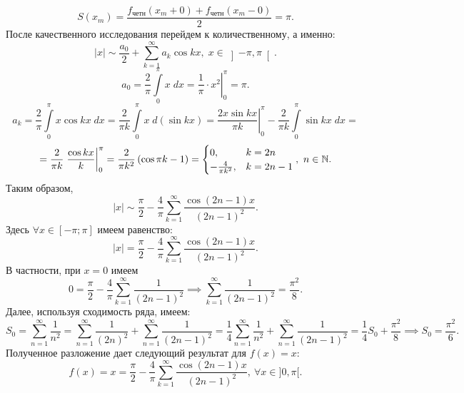 \documentclass[../../main.tex]{subfiles}
\begin{document}
\begin{examples}
\begin{enumerate}
				\[
					S(x_m) = \frac{f_{\text{четн}}(x_m+0)+ f_{\text{четн}}(x_m-0)}{2} = \pi.
				\]
				После качественного исследования перейдем к количественному, а именно:
				\[
					|x| \sim \frac{a_0}{2} + \sum_{k=1}^{\infty}  a_k \cos k x, \; x \in 
					\left]-\pi, \pi\right[.
				\]
				\[
					a_0 = \frac{2}{\pi} \int\limits_{0}^{\pi}x\;dx = \left. 
					\frac{1}{\pi}\cdot  x^2 \right|_0^{\pi} = \pi.
				\]
				\[
					a_k = \frac{2}{\pi} \int\limits_{0}^{\pi}x \cos kx\; dx = 
					\frac{2}{\pi k } \int\limits_{0}^{\pi}x\;d (\sin kx) = 
					\left. \frac{2x \sin kx}{\pi k}\right|_0^{\pi} - \frac{2}{\pi k} 
					\int\limits_{0}^{\pi}\sin kx\; dx = 
				\]
				\[
				 = \frac{2}{\pi k} \left. \frac{\cos k x}{k} \right|_0^{\pi} =
				 \frac{2}{\pi k^2} \left( \cos \pi k - 1 \right) = 
				 \begin{cases}
				 0,& k = 2n \\
				 -\frac{4}{\pi k^2},& k = 2n-1
				 \end{cases}, \ n \in \mathbb{N}.
				\]
				Таким образом,
				\[
					|x| \sim \frac{\pi}{2} - \frac{4}{\pi} 
					\sum_{k=1}^{\infty}\frac{\cos(2n-1)x}{(2n-1)^2}.
				\]
				Здесь $\forall x \in [-\pi; \pi]$ имеем равенство:
				\[
					|x| = \frac{\pi}{2} - \frac{4}{\pi} 
					\sum_{k=1}^{\infty}\frac{\cos(2n-1)x}{(2n-1)^2}.
				\]
				В частности, при $x = 0$ имеем
				\[
					0 = \frac{\pi}{2} - \frac{4}{\pi} \sum_{k=1}^{\infty}\frac{1}{(2n-1)^2} 
					\implies  \sum_{k=1}^{\infty}\frac{1}{(2n-1)^2} = \frac{\pi^2}{8}.
				\]
				Далее, используя сходимость ряда, имеем:
				\[
					S_0 = \sum_{n=1}^{\infty} \frac{1}{n^2} = \sum_{n=1}^{\infty} 
					\frac{1}{(2n)^2}  + \sum_{n=1}^{\infty} \frac{1}{(2n-1)^2} = 
					\frac{1}{4} \sum_{n=1}^{\infty} \frac{1}{n^2} +  \sum_{n=1}^{\infty} 
					\frac{1}{(2n-1)^2} =
					\frac{1}{4}S_0 + \frac{\pi^2}{8} \implies S_0 = \frac{\pi^2}{6}.
				\]
				Полученное разложение дает следующий результат для $f(x) = x$:
				\[
					f(x) = x = \frac{\pi}{2} - \frac{4}{\pi} 
					\sum_{k=1}^{\infty}\frac{\cos(2n-1)x}{(2n-1)^2}, \ \forall x \in ]0, \pi[.
				\]
			\end{enumerate}
		\end{examples}
\end{document}
